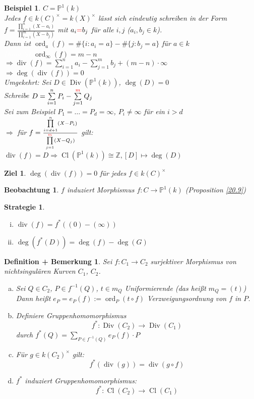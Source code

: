 \documentclass[a4paper,12pt]{report}
\theoremstyle{break}
\newtheorem{DefBem}[Def]{Definition + Bemerkung}
\newtheorem{Bsp}[Def]{Beispiel}
\theoremstyle{nonumberbreak}
\newtheorem{Beo}{Beobachtung}
\newtheorem{Ziel}{Ziel}
\newtheorem{Strat}{Strategie}
\theoremstyle{nonumberplain}
\newcommand{\Sum}{\sum\limits}
\DeclareMathOperator{\Cl}{Cl}
\DeclareMathOperator{\Div}{Div}
\DeclareMathOperator{\Ddiv}{div}
\DeclareMathOperator{\ord}{ord}
\newcommand{\Z}{\mathbb{Z}}
\newcommand{\IP}{\mathbb{P}}%
\newcommand{\X}{\times}
\begin{document}
\begin{Bsp}
$C=\IP^1(k)$\\
Jedes $f\in k(C)^\X=k(X)^\X$ l\"asst sich eindeutig schreiben in der Form $f=\frac{\prod\limits_{i=1}^n(X-a_i)}{\prod\limits_{i=1}^m(X-b_j)}$ mit $a_i\textcolor{red}{=}b_j$ f\"ur alle $i,j$ ($a_i,b_j\in k$).\\
Dann ist $\ord_a(f)=\#\{i:a_i=a\}-\#\{j:b_j=a\}$ f\"ur $a\in k$\\
\textcolor{white}{Dann ist} $\ord_\infty(f)=m-n$\\
$\Rightarrow \Ddiv(f)=\Sum_{i=1}^na_i-\Sum_{j=1}^mb_j+(m-n)\cdot\infty$\\
$\Rightarrow \deg(\Ddiv(f))=0$\\
Umgekehrt: Sei $D\in \Div(\IP^1(k))$, $\deg(D)=0$\\
Schreibe $D=\Sum_{i=1}^nP_i-\Sum_{j=1}^{\textcolor{red}{m}}Q_j$\\
Sei zum Beispiel $P_1=\ldots =P_d=\infty$, $P_i\ne\infty$ f\"ur ein $i>d$\\
$\Rightarrow$ f\"ur $f=\frac{\prod\limits_{i=d+1}^n(X-P_i)}{\prod\limits_{j=1}^{\textcolor{red}{m}}(X-Q_j)}$ gilt: $\Ddiv(f)=D \Rightarrow \Cl(\IP^1(k))\cong\Z, [D]\mapsto\deg(D)$
\end{Bsp}

\begin{Ziel}
$\deg(\Ddiv(f))=0$ f\"ur jedes $f\in k(C)^\X$
\end{Ziel}

\begin{Beo}
$f$ induziert Morphismus $f:C\to\IP^1(k)$ (Proposition \ref{20.9})
\end{Beo}

\begin{Strat}\begin{enumerate}[i)]
\item
	$\Ddiv(f)=f^*((0)-(\infty))$
\item
	$\deg(f^*(D))=\deg(f)-\deg(G)$
\end{enumerate}\end{Strat}

\begin{DefBem}
Sei $f:C_1\to C_2$ surjektiver Morphismus von nichtsingul\"aren Kurven $C_1$, $C_2$.\begin{enumerate}[a)]
\item
	Sei $Q\in C_2$, $P\in f^{-1}(Q)$, $t\in m_Q$ Uniformierende (das hei\ss t $m_Q=(t)$)\\
	Dann hei\ss t $e_P=e_P(f):=\ord_P(t\circ f)$ Verzweigungsordnung von $f$ in $P$.
\item
	Definiere Gruppenhomomorphismus	
		\[f^*: \Div(C_2) \to \Div(C_1) \]
	durch $f^*(Q)=\Sum_{P\in f^{-1}(Q)}e_P(f)\cdot P$
\item
	F\"ur $g\in k(C_2)^\X$ gilt:
		\[ f^*(\Ddiv(g))=\Ddiv(g\circ f) \]
\item
	$f^*$ induziert Gruppenhomomorphismus:
		\[ f^*: \Cl(C_2) \to \Cl(C_1) \]
\end{enumerate}\end{DefBem}
\end{document}
